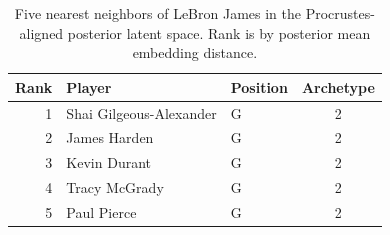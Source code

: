 \begin{table}[htbp]
  \centering\small
  \begin{tabular}{rllc}
    \toprule
    Rank & Player & Position & Archetype \\
    \midrule
    1 & Shai Gilgeous-Alexander & G & 2 \\
    2 & James Harden & G & 2 \\
    3 & Kevin Durant & G & 2 \\
    4 & Tracy McGrady & G & 2 \\
    5 & Paul Pierce & G & 2 \\
    \bottomrule
  \end{tabular}
  \caption{Five nearest neighbors of LeBron James in the Procrustes-aligned posterior latent space. Rank is by posterior mean embedding distance.}
  \label{tab:LeBron_James_neighbors}
\end{table}

